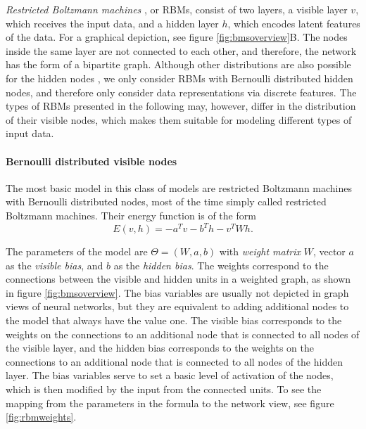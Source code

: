 \documentclass[12pt]{article}
\begin{document}
\emph{Restricted Boltzmann machines} \citep{smolensky1986foundations}, or RBMs,  consist of two layers, a visible layer $v$, which receives the input data, and a hidden layer $h$, which encodes latent features of the data. For a graphical depiction, see figure \ref{fig:bmsoverview}B.
The nodes inside the same layer are not connected to each other, and therefore, the network has the form of a bipartite graph.
Although other distributions are also possible for the hidden nodes \citep{hinton_practical_2012}, we only consider RBMs with Bernoulli distributed hidden nodes, and therefore only consider data representations via discrete features.
The types of RBMs presented in the following may, however, differ in the distribution of their visible nodes, which makes them suitable for modeling different types of input data.

\paragraph{Bernoulli distributed visible nodes}
The most basic model in this class of models are restricted Boltzmann machines with Bernoulli distributed nodes, most of the time simply called restricted Boltzmann machines. Their energy function is of the form
\begin{equation}
   E(v,h) = - a^T v - b^T h - v^T W h. \label{eqn:energyformularbm}
\end{equation}

The parameters of the model are $\Theta = (W, a, b)$ with \emph{weight matrix} $W$, vector $a$ as the \emph{visible bias}, and $b$ as the \emph{hidden bias}.
The weights correspond to the connections between the visible and hidden units in a weighted graph, as shown in figure \ref{fig:bmsoverview}.
The bias variables are usually not depicted in graph views of neural networks, but they are equivalent to adding additional nodes to the model that always have the value one. The visible bias corresponds to the weights on the connections to an additional node that is connected to all nodes of the visible layer, and the hidden bias corresponds to the weights on the connections to an additional node that is connected to all nodes of the hidden layer. The bias variables serve to set a basic level of activation of the nodes, which is then modified by the input from the connected units.
To see the mapping from the parameters in the formula to the network view, see figure \ref{fig:rbmweights}.
\end{document}
